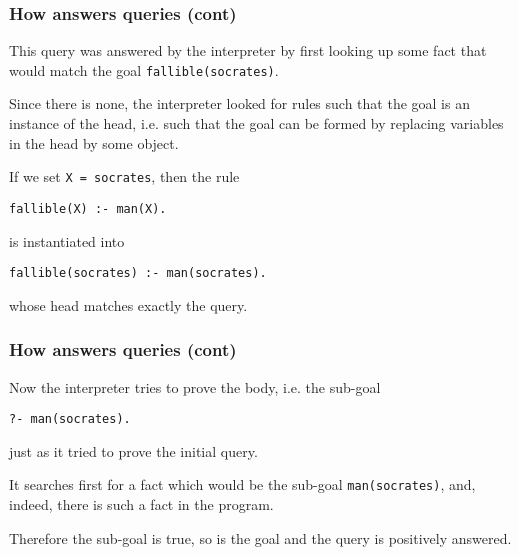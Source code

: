 %
\begin{frame}[containsverbatim]
\frametitle{How \Prolog answers queries (cont)}

This query was answered by the interpreter by first looking up some
fact that would match the goal \texttt{fallible(socrates)}. 

\bigskip

Since there is none, the interpreter looked for rules such that the
goal is an instance of the head, i.e. such that the goal can be formed
by replacing variables in the head by some object.

\bigskip

If we set \texttt{X = socrates}, then the rule
{\small
\begin{verbatim}
fallible(X) :- man(X).
\end{verbatim}
}
is instantiated into
{\small
\begin{verbatim}
fallible(socrates) :- man(socrates).
\end{verbatim}
}
whose head matches exactly the query. 

\end{frame}

%
\begin{frame}[containsverbatim]
\frametitle{How \Prolog answers queries (cont)}

Now the interpreter tries to prove the body, i.e. the sub-goal
{\small
\begin{verbatim}
?- man(socrates).
\end{verbatim}
}
just as it tried to prove the initial query.

\bigskip

It searches first for a fact which would be the sub-goal
\texttt{man(socrates)}, and, indeed, there is such a fact in the
program.

\bigskip

Therefore the sub-goal is true, so is the goal and the query is
positively answered.

\end{frame}

